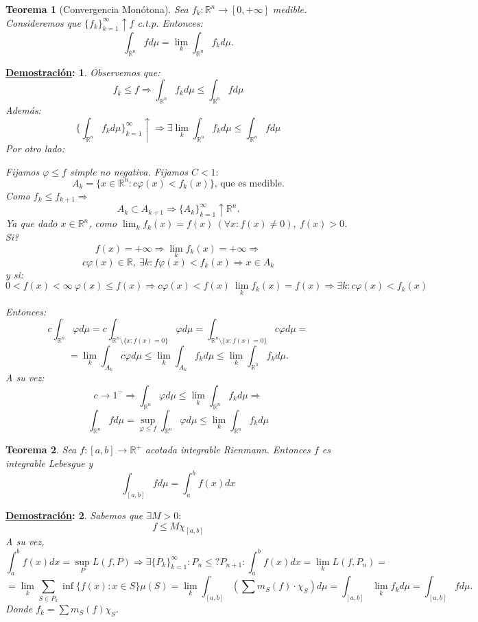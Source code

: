 \documentclass[10pt,a4paper,openright]{book}
\theoremstyle{break}
\newtheorem*{theo}{Teorema}
\newtheorem*{demo}{\underline{Demostración}:}
\begin{document}
\begin{theo}[Convergencia Monótona]
Sea $f_k: \mathbb{R}^n \rightarrow \left[0, +\infty\right]$ medible. Consideremos que $\{f_k\}_{k=1}^{\infty} \uparrow f$ c.t.p. Entonces:
$$\int_{\mathbb{R}^n}f d \mu = \lim_k \int_{\mathbb{R}^n} f_k d \mu.$$
\end{theo}
\begin{demo}
Observemos que:
$$f_k \le f \Rightarrow \int_{\mathbb{R}^n} f_k d \mu \le \int_{\mathbb{R}^n} f d \mu$$
Además:
$$\{\int_{\mathbb{R}^n} f_k d \mu\}_{k=1}^{\infty}\uparrow \Rightarrow \exists \lim_k \int_{\mathbb{R}^n} f_k d \mu \le \int_{\mathbb{R}^n}f d \mu$$
Por otro lado:

Fijamos $\varphi \le f$ simple no negativa. Fijamos $C < 1:$
$$A_k = \{x \in \mathbb{R}^n: c\varphi\left(x\right) < f_k\left(x\right)\}\text{, que es medible.}$$
Como $f_k \le f_{k+1} \Rightarrow$
$$A_k \subset A_{k+1} \Rightarrow \{A_k\}_{k=1}^{\infty} \uparrow \mathbb{R}^n.$$
Ya que dado $x \in \mathbb{R}^n$, como $\lim_k f_k\left(x\right) = f\left(x\right)\ \left(\forall x : f\left(x\right) \neq 0\right),\ f\left(x\right) > 0$.
Si?
$$f\left(x\right) = +\infty \Rightarrow \lim_k f_k \left(x\right) = +\infty \Rightarrow$$
$$c\varphi\left(x\right) \in \mathbb{R},\ \exists k : f\varphi\left(x\right) < f_k\left(x\right) \Rightarrow x \in A_k$$
y si:
$$0 < f\left(x\right) < \infty \ \varphi\left(x\right) \le f\left(x\right) \Rightarrow c\varphi\left(x\right) < f\left(x\right) \ \lim_k f_k\left(x\right) = f\left(x\right) \Rightarrow \exists k : c\varphi\left(x\right) < f_k\left(x\right)$$

Entonces:
$$c\int_{\mathbb{R}^n}\varphi d \mu = c\int_{\mathbb{R}^n \setminus \{x : f\left(x\right) = 0\}}\varphi d \mu = \int_{\mathbb{R}^n \setminus \{x : f\left(x\right) = 0\}} c \varphi d \mu =$$
$$= \lim_k \int_{A_k} c \varphi d \mu \le \lim_k \int_{A_k} f_k d \mu \le \lim_k \int_{\mathbb{R}^n} f_k d \mu.$$
A su vez:
$$c \rightarrow 1^- \Rightarrow \int_{\mathbb{R}^n} \varphi d \mu \le \lim_k \int_{\mathbb{R}^n} f_k d \mu \Rightarrow$$
$$\int_{\mathbb{R}^n}f d \mu = \sup_{\varphi \le f} \int_{\mathbb{R}^n}\varphi d \mu \le \lim_k \int_{\mathbb{R}^n}f_k d \mu$$
\end{demo}

\begin{theo}
Sea $f: \left[a, b\right] \rightarrow \mathbb{R}^+$ acotada integrable Rienmann. Entonces $f$ es integrable Lebesgue y 
$$\int_{\left[a, b\right]}f d \mu = \int_a^b f\left(x\right)dx$$
\end{theo}
\begin{demo}
Sabemos que $\exists M > 0:$
$$f \le M\chi_{\left[a, b\right]}$$
A su vez,
$$\int_a^b f\left(x\right)dx = \sup_{P}L\left(f, P\right) \Rightarrow \exists \{P_k\}_{k=1}^{\infty} : P_n \le? P_{n+1} : \int_a^b f\left(x\right)dx = \lim_k L\left(f, P_n\right) = $$
$$= \lim_k \sum_{S \in P_k} \inf \{f\left(x\right) : x \in S\}\mu\left(S\right) = \lim_k \int_{\left[a, b\right]}\left(\sum m_S \left(f\right) \cdot \chi_S\right) d \mu = \int_{\left[a, b\right]}\lim_k f_k d \mu = \int_{\left[a, b\right]}f d \mu.$$
Donde $f_k = \sum m_S\left(f\right) \chi_S.$
\end{demo}
\end{document}

